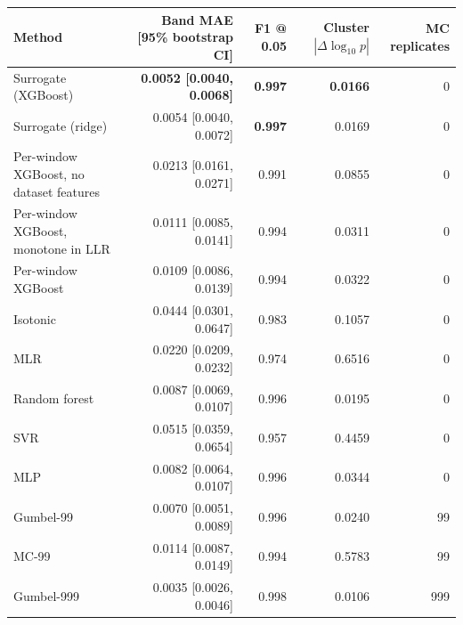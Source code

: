 \begin{tabular}{lrrrr}
\toprule
Method & Band MAE [95\% bootstrap CI] & F1 @ 0.05 & Cluster $|\Delta\log_{10}p|$ & MC replicates \\
\midrule
Surrogate (XGBoost) & \textbf{0.0052 [0.0040, 0.0068]} & \textbf{0.997} & \textbf{0.0166} & 0 \\
Surrogate (ridge) & 0.0054 [0.0040, 0.0072] & \textbf{0.997} & 0.0169 & 0 \\
Per-window XGBoost, no dataset features & 0.0213 [0.0161, 0.0271] & 0.991 & 0.0855 & 0 \\
Per-window XGBoost, monotone in LLR & 0.0111 [0.0085, 0.0141] & 0.994 & 0.0311 & 0 \\
Per-window XGBoost & 0.0109 [0.0086, 0.0139] & 0.994 & 0.0322 & 0 \\
\midrule
Isotonic & 0.0444 [0.0301, 0.0647] & 0.983 & 0.1057 & 0 \\
MLR & 0.0220 [0.0209, 0.0232] & 0.974 & 0.6516 & 0 \\
Random forest & 0.0087 [0.0069, 0.0107] & 0.996 & 0.0195 & 0 \\
SVR & 0.0515 [0.0359, 0.0654] & 0.957 & 0.4459 & 0 \\
MLP & 0.0082 [0.0064, 0.0107] & 0.996 & 0.0344 & 0 \\
\midrule
Gumbel-99 & 0.0070 [0.0051, 0.0089] & 0.996 & 0.0240 & 99 \\
MC-99 & 0.0114 [0.0087, 0.0149] & 0.994 & 0.5783 & 99 \\
\midrule
Gumbel-999 & 0.0035 [0.0026, 0.0046] & 0.998 & 0.0106 & 999 \\
\bottomrule
\end{tabular}

